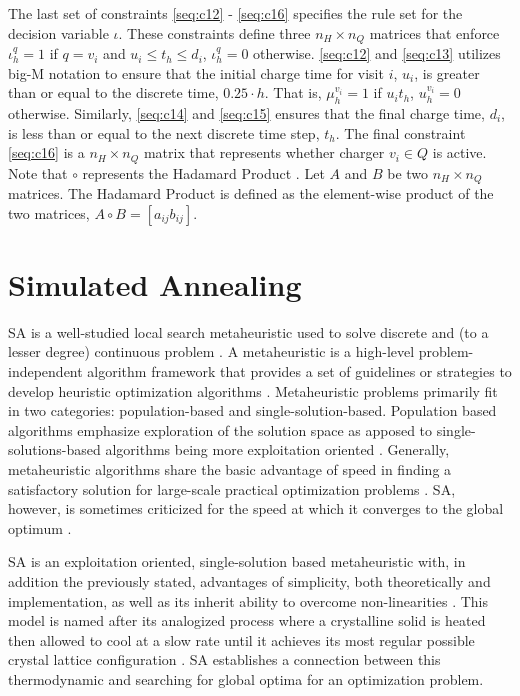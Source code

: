 \documentclass[11pt,a4paper,final]{article}
\newcommand{\Qset}{Q}                       %
\begin{document}
The last set of constraints \ref{seq:c12} - \ref{seq:c16} specifies the rule set for the decision variable \(\iota\). These
constraints define three \(n_H \times n_Q\) matrices that enforce \(\iota_h^q = 1\) if \(q = v_i\) and \(u_i \le t_h \le d_i\), \(\iota_h^q = 0\)
otherwise. \ref{seq:c12} and \ref{seq:c13} utilizes big-M notation to ensure that the initial charge time for visit \(i\),
\(u_i\), is greater than or equal to the discrete time, \(0.25 \cdot h\). That is, \(\mu_h^{v_i} = 1\) if \(u_i t_h\), \(u_h^{v_i} = 0\)
otherwise. Similarly, \ref{seq:c14} and \ref{seq:c15} ensures that the final charge time, \(d_i\), is less than or equal
to the next discrete time step, \(t_h\). The final constraint \ref{seq:c16} is a \(n_H \times n_Q\) matrix that represents
whether charger \(v_i \in \Qset\) is active. Note that \(\circ\) represents the Hadamard Product \cite{horn-1985-matrix-analy}.
Let \(A\) and \(B\) be two \(n_H \times n_Q\) matrices. The Hadamard Product is defined as the element-wise product of the two
matrices, \(A \circ B = [a_{ij}b_{ij}]\).
\section{Simulated Annealing}
\label{sec:simulated-annealing}
SA is a well-studied local search metaheuristic used to solve discrete and (to a lesser degree) continuous problem
\cite{gendreau-2018-handb-metah}. A metaheuristic is a high-level problem-independent algorithm framework that provides
a set of guidelines or strategies to develop heuristic optimization algorithms \cite{radosavljevic-2018-metah-optim}.
Metaheuristic problems primarily fit in two categories: population-based and single-solution-based. Population based
algorithms emphasize exploration of the solution space as apposed to single-solutions-based algorithms being more
exploitation oriented \cite{radosavljevic-2018-metah-optim}. Generally, metaheuristic algorithms share the basic
advantage of speed in finding a satisfactory solution for large-scale practical optimization problems
\cite{radosavljevic-2018-metah-optim}. SA, however, is sometimes criticized for the speed at which it converges to the
global optimum \cite{gendreau-2018-handb-metah,henderson-1989-theor-pract}.

SA is an exploitation oriented, single-solution based metaheuristic with, in addition the previously stated, advantages
of simplicity, both theoretically and implementation, as well as its inherit ability to overcome non-linearities
\cite{gendreau-2018-handb-metah,radosavljevic-2018-metah-optim}. This model is named after its analogized process
where a crystalline solid is heated then allowed to cool at a slow rate until it achieves its most regular possible
crystal lattice configuration \cite{henderson-1989-theor-pract}. SA establishes a connection between this thermodynamic
and searching for global optima for an optimization problem.
\end{document}
